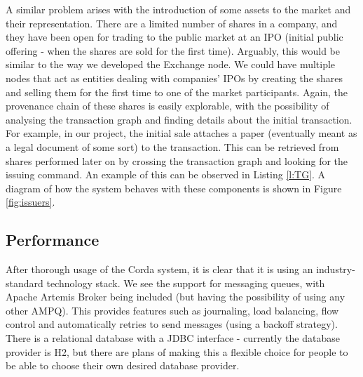 \documentclass[12pt,twoside]{article}
\begin{document}
A similar problem arises with the introduction of some assets to the market and their representation. There are a limited number of shares in a company, and they have been open for trading to the public market at an IPO (initial public offering - when the shares are sold for the first time). Arguably, this would be similar to the way we developed the Exchange node. We could have multiple nodes that act as entities dealing with companies' IPOs by creating the shares and selling them for the first time to one of the market participants. Again, the provenance chain of these shares is easily explorable, with the possibility of analysing the transaction graph and finding details about the initial transaction. For example, in our project, the initial sale attaches a paper (eventually meant as a legal document of some sort) to the transaction. This can be retrieved from shares performed later on by crossing the transaction graph and looking for the issuing command. An example of this can be observed in Listing \ref{l:TG}. A diagram of how the system behaves with these components is shown in Figure \ref{fig:issuers}.

\subsection{Performance}
\label{sub:Performance}
After thorough usage of the Corda system, it is clear that it is using an industry-standard technology stack. We see the support for messaging queues, with Apache Artemis Broker being included (but having the possibility of using any other AMPQ). This provides features such as journaling, load balancing, flow control and automatically retries to send messages (using a backoff strategy). There is a relational database with a JDBC interface - currently the database provider is H2, but there are plans of making this a flexible choice for people to be able to choose their own desired database provider.
\end{document}
